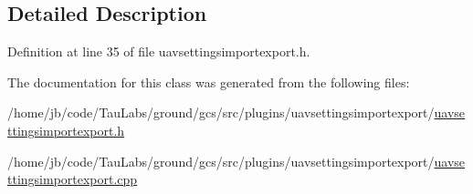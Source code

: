 \subsection{\-Detailed \-Description}


\-Definition at line 35 of file uavsettingsimportexport.\-h.



\-The documentation for this class was generated from the following files\-:\begin{DoxyCompactItemize}
\item 
/home/jb/code/\-Tau\-Labs/ground/gcs/src/plugins/uavsettingsimportexport/\hyperlink{uavsettingsimportexport_8h}{uavsettingsimportexport.\-h}\item 
/home/jb/code/\-Tau\-Labs/ground/gcs/src/plugins/uavsettingsimportexport/\hyperlink{uavsettingsimportexport_8cpp}{uavsettingsimportexport.\-cpp}\end{DoxyCompactItemize}
